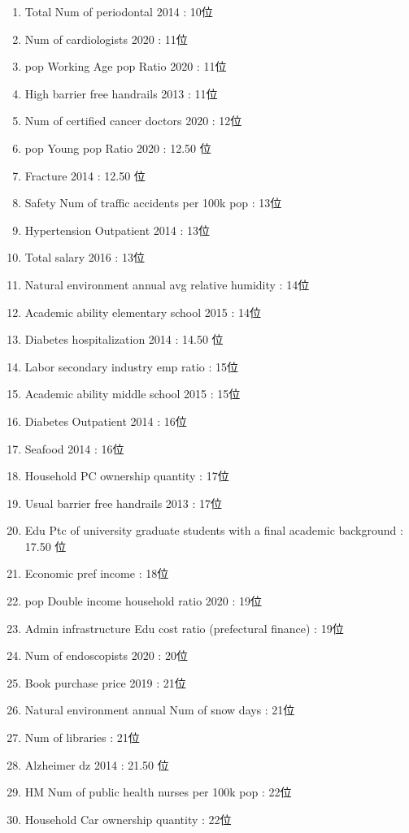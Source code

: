 \begin{multicols}{2}
\begin{enumerate}
	\item Total Num of periodontal 2014 : 10位
	\item Num of cardiologists 2020 : 11位
	\item pop Working Age pop Ratio 2020 : 11位
	\item High barrier free handrails 2013 : 11位
	\item Num of certified cancer doctors 2020 : 12位
	\item pop Young pop Ratio 2020 : 12.50 位
	\item Fracture 2014 : 12.50 位
	\item Safety Num of traffic accidents per 100k pop : 13位
	\item Hypertension Outpatient 2014 : 13位
	\item Total salary 2016 : 13位
	\item Natural environment annual avg relative humidity : 14位
	\item Academic ability elementary school 2015 : 14位
	\item Diabetes hospitalization 2014 : 14.50 位
	\item Labor secondary industry emp ratio : 15位
	\item Academic ability middle school 2015 : 15位
	\item Diabetes Outpatient 2014 : 16位
	\item Seafood 2014 : 16位
	\item Household PC ownership quantity : 17位
	\item Usual barrier free handrails 2013 : 17位
	\item Edu Ptc of university graduate students with a final academic background : 17.50 位
	\item Economic pref income : 18位
	\item pop Double income household ratio 2020 : 19位
	\item Admin infrastructure Edu cost ratio (prefectural finance) : 19位
	\item Num of endoscopists 2020 : 20位
	\item Book purchase price 2019 : 21位
	\item Natural environment annual Num of snow days : 21位
	\item Num of libraries : 21位
	\item Alzheimer dz 2014 : 21.50 位
	\item HM Num of public health nurses per 100k pop : 22位
	\item Household Car ownership quantity : 22位

\end{enumerate}
\end{multicols}
